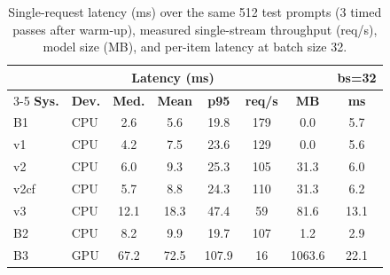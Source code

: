 \begin{table}[t]
\centering
\caption{Single-request latency (ms) over the same 512 test prompts (3 timed passes after warm-up), measured single-stream throughput (req/s), model size (MB), and per-item latency at batch size 32.}
\label{tab:latency}
\small
\setlength{\tabcolsep}{3pt}
\begin{tabular}{llcccccc}
\toprule
 & & \multicolumn{3}{c}{\textbf{Latency (ms)}} & & & \textbf{bs=32} \\
\cmidrule(lr){3-5}
\textbf{Sys.} & \textbf{Dev.} & \textbf{Med.} & \textbf{Mean} & \textbf{p95} & \textbf{req/s} & \textbf{MB} & \textbf{ms} \\
\midrule
B1 & CPU & 2.6 & 5.6 & 19.8 & 179 & 0.0 & 5.7 \\
v1 & CPU & 4.2 & 7.5 & 23.6 & 129 & 0.0 & 5.6 \\
v2 & CPU & 6.0 & 9.3 & 25.3 & 105 & 31.3 & 6.0 \\
v2cf & CPU & 5.7 & 8.8 & 24.3 & 110 & 31.3 & 6.2 \\
v3 & CPU & 12.1 & 18.3 & 47.4 & 59 & 81.6 & 13.1 \\
B2 & CPU & 8.2 & 9.9 & 19.7 & 107 & 1.2 & 2.9 \\
B3 & GPU & 67.2 & 72.5 & 107.9 & 16 & 1063.6 & 22.1 \\
\bottomrule
\end{tabular}
\end{table}
